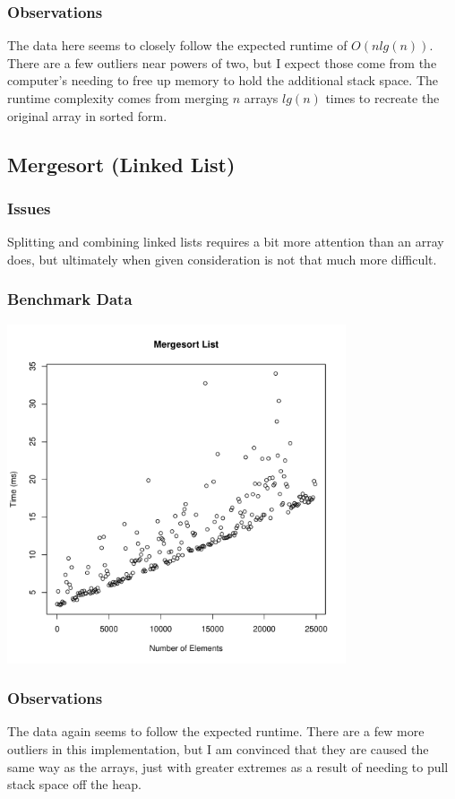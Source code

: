 \documentclass[a4paper,12pt]{article}
\begin{document}
\subsubsection{Observations}
The data here seems to closely follow the expected runtime of $O(nlg(n))$. There are a few outliers near powers of two, but I expect those come from the computer's needing
to free up memory to hold the additional stack space. The runtime complexity comes from merging $n$ arrays $lg(n)$ times to recreate the original array in sorted form.
\subsection{Mergesort (Linked List)}
\subsubsection{Issues}
Splitting and combining linked lists requires a bit more attention than an array does, but ultimately when given consideration is not that much more difficult.
\subsubsection{Benchmark Data}
\includegraphics[height=10cm]{mergesort_list}
\subsubsection{Observations}
The data again seems to follow the expected runtime. There are a few more outliers in this implementation, but I am convinced that they are caused the same way as
the arrays, just with greater extremes as a result of needing to pull stack space off the heap.
\end{document}
